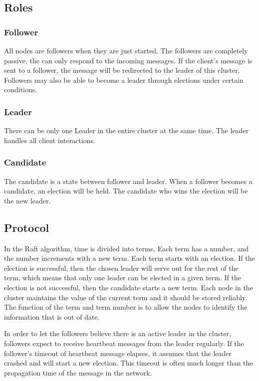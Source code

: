 \documentclass[12pt, a4paper]{article}
\begin{document}
\subsection{Roles}
  \subsubsection{Follower}
  All nodes are followers when they are just started. The followers are completely passive, the can only respond to the incoming
  messages. If the client's message is sent to a follower, the message will be redirected to the leader of this cluster. Followers may
  also be able to become a leader through elections under certain conditions.
  \subsubsection{Leader}
  There can be only one Leader in the entire cluster at the same time. The leader handles all client interactions.
  \subsubsection{Candidate}
  The candidate is a state between follower and leader. When a follower becomes a candidate, an election will be held. The candidate
  who wins the election will be the new leader.
\subsection{Protocol}
In the Raft algorithm, time is divided into terms, Each term has a number, and the number increments with a new term. Each term starts
with an election. If the election is successful, then the chosen leader will serve out for the rest of the term, which means that
only one leader can be elected in a given term. If the election is not successful, then the candidate starts a new term. Each node
in the cluster maintains the value of the current term and it should be stored reliably. The function of the term and term number is
to allow the nodes to identify the information that is out of date.
\par
In order to let the followers believe there is an active leader in the cluster, followers expect to receive heartbeat messages from
the leader regularly. If the follower's timeout of heartbeat message elapses, it assumes that the leader crashed and will start a
new election. This timeout is often much longer than the propagation time of the message in the network.
\end{document}
